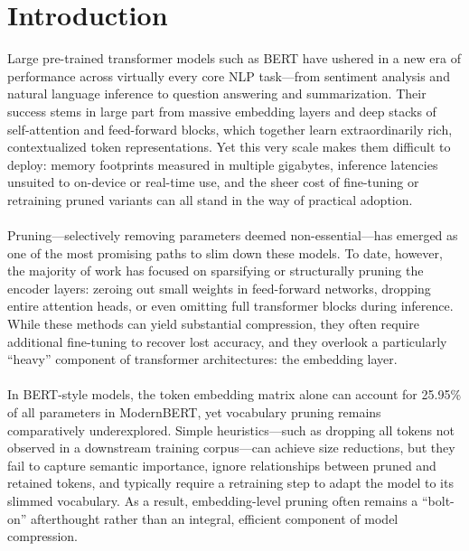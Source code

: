 \documentclass[twocolumn]{article}
\begin{document}


\section{Introduction}

Large pre-trained transformer models such as BERT have ushered in a new era of performance across virtually every core NLP task---from sentiment analysis and natural language inference to question answering and summarization. Their success stems in large part from massive embedding layers and deep stacks of self-attention and feed-forward blocks, which together learn extraordinarily rich, contextualized token representations. Yet this very scale makes them difficult to deploy: memory footprints measured in multiple gigabytes, inference latencies unsuited to on-device or real-time use, and the sheer cost of fine-tuning or retraining pruned variants can all stand in the way of practical adoption.
\\ \\
Pruning---selectively removing parameters deemed non-essential---has emerged as one of the most promising paths to slim down these models. To date, however, the majority of work has focused on sparsifying or structurally pruning the encoder layers: zeroing out small weights in feed-forward networks, dropping entire attention heads, or even omitting full transformer blocks during inference. While these methods can yield substantial compression, they often require additional fine-tuning to recover lost accuracy, and they overlook a particularly ``heavy'' component of transformer architectures: the embedding layer.
\\ \\
In BERT-style models, the token embedding matrix alone can account for 25.95\% of all parameters in ModernBERT, yet vocabulary pruning remains comparatively underexplored. Simple heuristics---such as dropping all tokens not observed in a downstream training corpus---can achieve size reductions, but they fail to capture semantic importance, ignore relationships between pruned and retained tokens, and typically require a retraining step to adapt the model to its slimmed vocabulary. As a result, embedding-level pruning often remains a ``bolt-on'' afterthought rather than an integral, efficient component of model compression.
\end{document}
